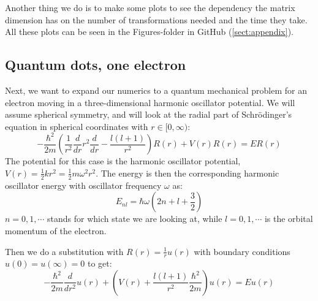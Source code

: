 \documentclass[12pt,a4paper,english]{article}
\begin{document}
Another thing we do is to make some plots to see the dependency the matrix dimension has on the number of transformations needed and the time they take. All these plots can be seen in the Figures-folder in GitHub (\ref{sect:appendix}).

\subsection{Quantum dots, one electron}
\label{sect:quantum_one}
Next, we want to expand our numerics to a quantum mechanical problem for an electron moving in a three-dimensional harmonic oscillator potential. We will assume spherical symmetry, and will look at the radial part of Schrödinger's equation in spherical coordinates with $r\in[0,\infty)$:
\begin{equation}
\label{eq:rad_schr_1}
-\frac{\hbar^2}{2m}\left(\frac{1}{r^2}\frac{d}{dr}r^2\frac{d}{dr}-\frac{l(l+1)}{r^2}\right)R(r) + V(r)R(r)=ER(r)
\end{equation}
The potential for this case is the harmonic oscillator potential, $V(r)=\frac{1}{2}kr^2=\frac{1}{2}m\omega^2r^2$. The energy is then the corresponding harmonic oscillator energy with oscillator frequency $\omega$ as:
\begin{equation}
\label{eq:HO_energy_1}
E_{nl} = \hbar \omega\left(2n + l + \frac{3}{2}\right)
\end{equation}
$n=0,1,\cdots$ stands for which state we are looking at, while $l=0,1,\cdots$ is the orbital momentum of the electron. 

Then we do a substitution with $R(r)=\frac{1}{r}u(r)$ with boundary conditions\\ $u(0)=u(\infty)=0$ to get:
\begin{equation}
\label{eq:before_scale}
-\frac{\hbar^2}{2m}\frac{d}{dr^2}u(r)+\left(V(r)+\frac{l(l+1)}{r^2}\frac{\hbar^2}{2m}\right)u(r)=Eu(r)
\end{equation}
\end{document}
